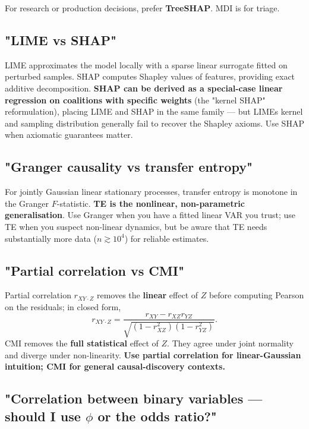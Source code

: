 \documentclass{article}
\begin{document}
For research or production decisions, prefer \textbf{TreeSHAP}. MDI is
for triage.

\subsection{"LIME vs SHAP"}\label{lime-vs-shap}

LIME approximates the model locally with a sparse linear surrogate
fitted on perturbed samples. SHAP computes Shapley values of features,
providing exact additive decomposition. \textbf{SHAP can be derived as a
special-case linear regression on coalitions with specific weights} (the
"kernel SHAP" reformulation), placing LIME and SHAP in the same family
--- but LIME\textquotesingle s kernel and sampling distribution
generally fail to recover the Shapley axioms. Use SHAP when axiomatic
guarantees matter.

\subsection{"Granger causality vs transfer
entropy"}\label{granger-causality-vs-transfer-entropy}

For jointly Gaussian linear stationary processes, transfer entropy is
monotone in the Granger \(F\)-statistic. \textbf{TE is the nonlinear,
non-parametric generalisation}. Use Granger when you have a fitted
linear VAR you trust; use TE when you suspect non-linear dynamics, but
be aware that TE needs substantially more data (\(n \gtrsim 10^4\)) for
reliable estimates.

\subsection{"Partial correlation vs
CMI"}\label{partial-correlation-vs-cmi}

Partial correlation \(r_{XY \cdot Z}\) removes the \textbf{linear}
effect of \(Z\) before computing Pearson on the residuals; in closed
form,
\[
r_{XY \cdot Z} = \frac{r_{XY} - r_{XZ} r_{YZ}}{\sqrt{(1 - r_{XZ}^2)(1 - r_{YZ}^2)}}.
\]
CMI removes the \textbf{full statistical} effect of \(Z\). They agree
under joint normality and diverge under non-linearity. \textbf{Use
partial correlation for linear-Gaussian intuition; CMI for general
causal-discovery contexts.}

\subsection{\texorpdfstring{"Correlation between binary variables ---
should I use \(\phi\) or the odds
ratio?"}{"Correlation between binary variables --- should I use \textbackslash phi or the odds ratio?"}}\label{correlation-between-binary-variables--should-i-use-phi-or-the-odds-ratio}
\end{document}
